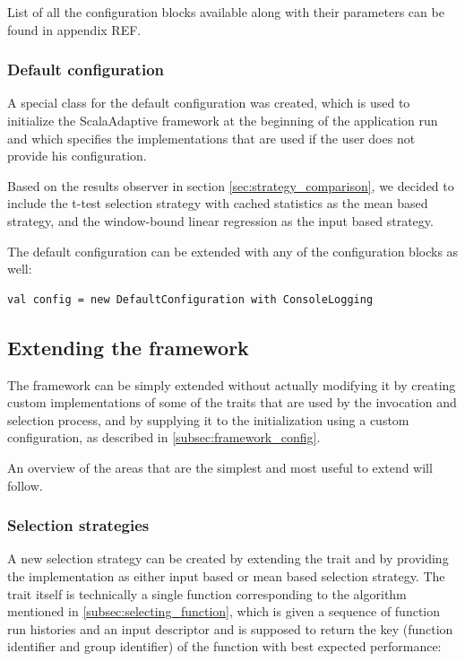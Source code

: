 List of all the configuration blocks available along with their parameters can be found in appendix REF.


\subsubsection{Default configuration}

A special class for the default configuration was created, which is used to initialize the ScalaAdaptive framework at the beginning of the application run and which specifies the implementations that are used if the user does not provide his configuration.

Based on the results observer in section \ref{sec:strategy_comparison}, we decided to include the t-test selection strategy with cached statistics as the mean based strategy, and the window-bound linear regression as the input based strategy.

The default configuration can be extended with any of the configuration blocks as well:

\lstset{style=Scala}
\begin{lstlisting}
val config = new DefaultConfiguration with ConsoleLogging
\end{lstlisting}

\subsection{Extending the framework}

The framework can be simply extended without actually modifying it by creating custom implementations of some of the traits that are used by the invocation and selection process, and by supplying it to the  initialization using a custom configuration, as described in \ref{subsec:framework_config}.

An overview of the areas that are the simplest and most useful to extend will follow.

\subsubsection{Selection strategies}

A new selection strategy can be created by extending the  trait and by providing the implementation as either input based or mean based selection strategy. The trait itself is technically a single function corresponding to the algorithm mentioned in \ref{subsec:selecting_function}, which is given a sequence of function run histories and an input descriptor and is supposed to return the key (function identifier and group identifier) of the function with best expected performance:

